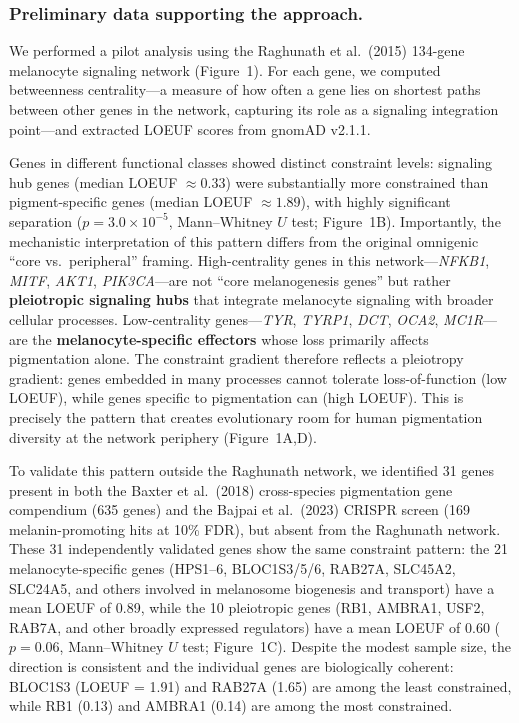 \documentclass[11pt]{article}
\begin{document}
\subsubsection{Preliminary data supporting the approach.}
We performed a pilot analysis using the Raghunath et al.\ (2015) 134-gene melanocyte signaling network (Figure~1). For each gene, we computed betweenness centrality---a measure of how often a gene lies on shortest paths between other genes in the network, capturing its role as a signaling integration point---and extracted LOEUF scores from gnomAD v2.1.1.

Genes in different functional classes showed distinct constraint levels: signaling hub genes (median LOEUF $\approx 0.33$) were substantially more constrained than pigment-specific genes (median LOEUF $\approx 1.89$), with highly significant separation ($p = 3.0 \times 10^{-5}$, Mann--Whitney $U$ test; Figure~1B). Importantly, the mechanistic interpretation of this pattern differs from the original omnigenic ``core vs.\ peripheral'' framing. High-centrality genes in this network---\emph{NFKB1}, \emph{MITF}, \emph{AKT1}, \emph{PIK3CA}---are not ``core melanogenesis genes'' but rather \textbf{pleiotropic signaling hubs} that integrate melanocyte signaling with broader cellular processes. Low-centrality genes---\emph{TYR}, \emph{TYRP1}, \emph{DCT}, \emph{OCA2}, \emph{MC1R}---are the \textbf{melanocyte-specific effectors} whose loss primarily affects pigmentation alone. The constraint gradient therefore reflects a pleiotropy gradient: genes embedded in many processes cannot tolerate loss-of-function (low LOEUF), while genes specific to pigmentation can (high LOEUF). This is precisely the pattern that creates evolutionary room for human pigmentation diversity at the network periphery (Figure~1A,D).

To validate this pattern outside the Raghunath network, we identified 31 genes present in both the Baxter et al.\ (2018) cross-species pigmentation gene compendium (635 genes) and the Bajpai et al.\ (2023) CRISPR screen (169 melanin-promoting hits at 10\% FDR), but absent from the Raghunath network. These 31 independently validated genes show the same constraint pattern: the 21 melanocyte-specific genes (HPS1--6, BLOC1S3/5/6, RAB27A, SLC45A2, SLC24A5, and others involved in melanosome biogenesis and transport) have a mean LOEUF of 0.89, while the 10 pleiotropic genes (RB1, AMBRA1, USF2, RAB7A, and other broadly expressed regulators) have a mean LOEUF of 0.60 ($p = 0.06$, Mann--Whitney $U$ test; Figure~1C). Despite the modest sample size, the direction is consistent and the individual genes are biologically coherent: BLOC1S3 (LOEUF = 1.91) and RAB27A (1.65) are among the least constrained, while RB1 (0.13) and AMBRA1 (0.14) are among the most constrained.
\end{document}
